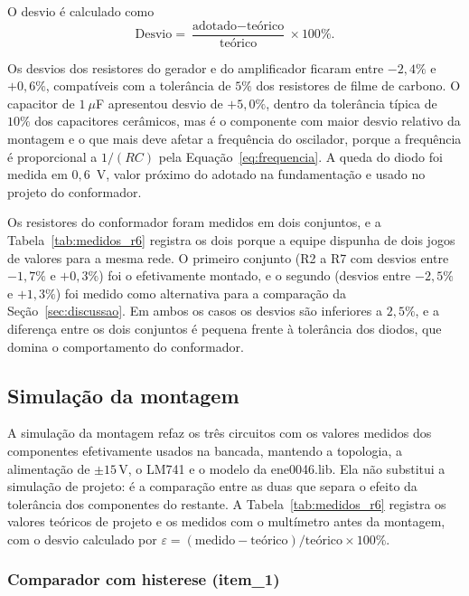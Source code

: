 \documentclass[11pt,a4paper]{article}
\begin{document}
O desvio é calculado como
\begin{equation}
\text{Desvio} = \frac{\text{adotado} - \text{teórico}}{\text{teórico}} \times 100\%.
\label{eq:desvio}
\end{equation}
 
Os desvios dos resistores do gerador e do amplificador ficaram entre $-2{,}4\%$ e
$+0{,}6\%$, compatíveis com a tolerância de $5\%$ dos resistores de filme de
carbono. O capacitor de $1~\mu$F apresentou desvio de $+5{,}0\%$, dentro da
tolerância típica de $10\%$ dos capacitores cerâmicos, mas é o componente com
maior desvio relativo da montagem e o que mais deve afetar a frequência do
oscilador, porque a frequência é proporcional a $1/(RC)$ pela
Equação~\eqref{eq:frequencia}. A queda do diodo foi medida em $0{,}6$~V, valor
próximo do adotado na fundamentação e usado no projeto do conformador.
 
Os resistores do conformador foram medidos em dois conjuntos, e a
Tabela~\ref{tab:medidos_r6} registra os dois porque a equipe dispunha de dois
jogos de valores para a mesma rede. O primeiro conjunto (R2 a R7 com desvios
entre $-1{,}7\%$ e $+0{,}3\%$) foi o efetivamente montado, e o segundo
(desvios entre $-2{,}5\%$ e $+1{,}3\%$) foi medido como alternativa para a
comparação da Seção~\ref{sec:discussao}. Em ambos os casos os desvios são
inferiores a $2{,}5\%$, e a diferença entre os dois conjuntos é pequena frente à
tolerância dos diodos, que domina o comportamento do conformador.
 
\subsection{Simulação da montagem}

A simulação da montagem refaz os três circuitos com os valores medidos dos componentes efetivamente usados na bancada, mantendo a topologia, a alimentação de \(\pm15\,\mathrm{V}\), o LM741 e o modelo da ene0046.lib. Ela não substitui a simulação de projeto: é a comparação entre as duas que separa o efeito da tolerância dos componentes do restante. A Tabela~\ref{tab:medidos_r6} registra os valores teóricos de projeto e os medidos com o multímetro antes da montagem, com o desvio calculado por \(\varepsilon = (\text{medido} - \text{teórico})/\text{teórico} \times 100\%\).

\subsubsection{Comparador com histerese (item\_1)}
\end{document}
